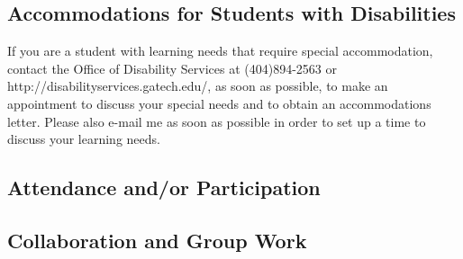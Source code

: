 \documentclass[10pt]{article}
\begin{document}
\subsection*{Accommodations for Students with Disabilities}
If you are a student with learning needs that require special accommodation, contact the Office of Disability Services at (404)894-2563 or http://disabilityservices.gatech.edu/, as soon as possible, to make an appointment to discuss your special needs and to obtain an accommodations letter.  Please also e-mail me as soon as possible in order to set up a time to discuss your learning needs.
%
\subsection*{Attendance and/or Participation}
%
\subsection*{Collaboration and Group Work}
%
\end{document}
